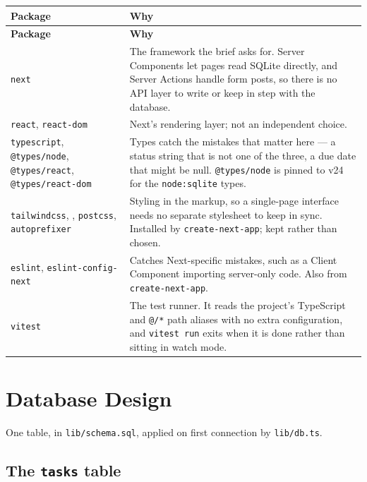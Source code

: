 \documentclass[11pt,a4paper]{article}
\begin{document}
\begin{longtable}{L{4cm} L{10.5cm}}
\toprule
\textbf{Package} & \textbf{Why} \\
\midrule
\endfirsthead
\toprule
\textbf{Package} & \textbf{Why} \\
\midrule
\endhead
\texttt{next} & The framework the brief asks for. Server Components let pages
read SQLite directly, and Server Actions handle form posts, so there is no API
layer to write or keep in step with the database. \\
\addlinespace
\texttt{react}, \texttt{react-dom} & Next's rendering layer; not an independent
choice. \\
\addlinespace
\texttt{typescript}, \texttt{@types/node}, \texttt{@types/react},
\texttt{@types/react-dom} & Types catch the mistakes that matter here --- a
status string that is not one of the three, a due date that might be null.
\texttt{@types/node} is pinned to v24 for the \texttt{node:sqlite} types. \\
\addlinespace
\texttt{tailwindcss}, , \texttt{postcss},
\texttt{autoprefixer} & Styling in the markup, so a single-page interface needs
no separate stylesheet to keep in sync. Installed by \texttt{create-next-app};
kept rather than chosen. \\
\addlinespace
\texttt{eslint}, \texttt{eslint-config-next} & Catches Next-specific mistakes,
such as a Client Component importing server-only code. Also from
\texttt{create-next-app}. \\
\addlinespace
\texttt{vitest} & The test runner. It reads the project's TypeScript and
\texttt{@/*} path aliases with no extra configuration, and \texttt{vitest run}
exits when it is done rather than sitting in watch mode. \\
\bottomrule
\end{longtable}

\section{Database Design}

One table, in \texttt{lib/schema.sql}, applied on first connection by
\texttt{lib/db.ts}.

\subsection{The \texttt{tasks} table}
\end{document}
